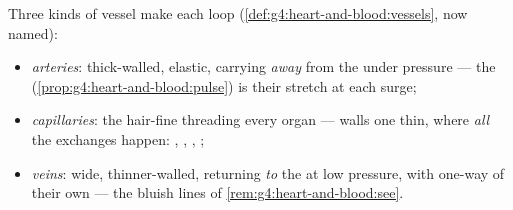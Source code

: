 \begin{definition}\label{def:g7:heart-and-circulation:vessels}
Three kinds of vessel make each loop
(\cref{def:g4:heart-and-blood:vessels}, now named):
\begin{itemize}
  \item \emph{arteries}: thick-walled,
        elastic, carrying  \emph{away} from the
         under pressure --- the 
        (\cref{prop:g4:heart-and-blood:pulse}) is their
        stretch at each surge;
  \item \emph{capillaries}: the
        hair-fine  threading every organ ---
        walls one  thin, where \emph{all} the
        exchanges happen: , , , ;
  \item \emph{veins}: wide, thinner-walled,
        returning  \emph{to} the  at low
        pressure, with one-way  of their own ---
        the bluish lines of
        \cref{rem:g4:heart-and-blood:see}.
\end{itemize}
\end{definition}

